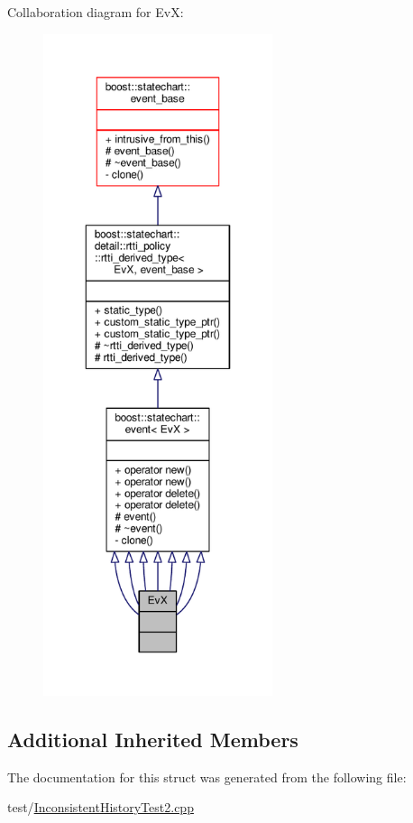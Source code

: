 Collaboration diagram for EvX\+:
\nopagebreak
\begin{figure}[H]
\begin{center}
\leavevmode
\includegraphics[height=550pt]{struct_ev_x__coll__graph}
\end{center}
\end{figure}
\subsection*{Additional Inherited Members}


The documentation for this struct was generated from the following file\+:\begin{DoxyCompactItemize}
\item 
test/\mbox{\hyperlink{_inconsistent_history_test2_8cpp}{Inconsistent\+History\+Test2.\+cpp}}\end{DoxyCompactItemize}
